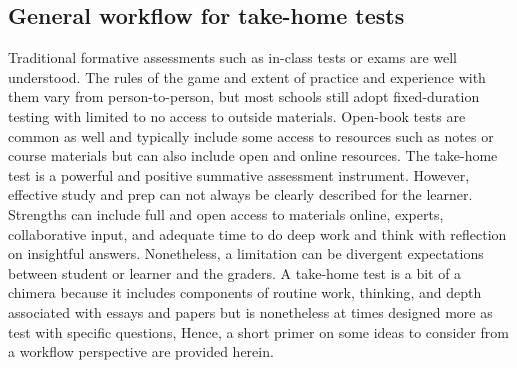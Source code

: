 \documentclass[
]{book}
\begin{document}
\hypertarget{general-workflow-for-take-home-tests}{%
\subsection*{General workflow for take-home tests}\label{general-workflow-for-take-home-tests}}

Traditional formative assessments such as in-class tests or exams are well understood. The rules of the game and extent of practice and experience with them vary from person-to-person, but most schools still adopt fixed-duration testing with limited to no access to outside materials. Open-book tests are common as well and typically include some access to resources such as notes or course materials but can also include open and online resources. The take-home test is a powerful and positive summative assessment instrument. However, effective study and prep can not always be clearly described for the learner. Strengths can include full and open access to materials online, experts, collaborative input, and adequate time to do deep work and think with reflection on insightful answers. Nonetheless, a limitation can be divergent expectations between student or learner and the graders. A take-home test is a bit of a chimera because it includes components of routine work, thinking, and depth associated with essays and papers but is nonetheless at times designed more as test with specific questions, Hence, a short primer on some ideas to consider from a workflow perspective are provided herein.
\end{document}

